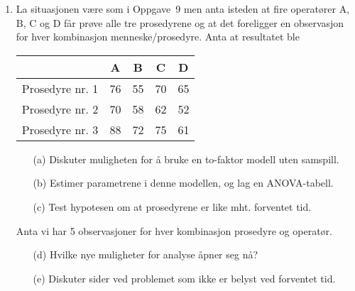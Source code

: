 \begin{enumerate}
\item
La situasjonen være som i Oppgave~9 men anta isteden at fire
operatører A, B, C og D  får prøve alle tre prosedyrene og at 
det foreligger en observasjon for hver kombinasjon menneske/prosedyre.
Anta at resultatet ble
\begin{center}
\begin{tabular}{c|cccc}
              &   A    &   B    &   C    &   D \\ \hline
Prosedyre nr. 1  &   76   &   55   &   70   &   65 \\
Prosedyre nr. 2  &   70   &   58   &   62   &   52 \\
Prosedyre nr. 3  &   88   &   72   &   75   &   61 \\ \hline
\end{tabular}
\end{center}
\begin{itemize}
\item[(a)] Diskuter muligheten for å bruke en to-faktor modell
           uten samspill.
\item[(b)] Estimer parametrene i denne modellen, og lag en ANOVA-tabell.
\item[(c)] Test hypotesen om at prosedyrene er like mht. forventet tid.
\end{itemize}
Anta vi har 5 observasjoner for hver kombinasjon prosedyre og 
operatør.
\begin{itemize}
\item[(d)] Hvilke nye muligheter for analyse åpner seg nå?
\item[(e)] Diskuter sider ved problemet som ikke er belyst ved forventet tid.
\end{itemize}


\end{enumerate}
